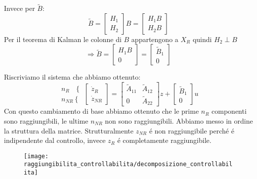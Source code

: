 \documentclass[../main.tex]{subfiles}
\begin{document}
		Invece per $ \tilde B $:
		\[
			\tilde B=
			\begin{bmatrix}
				H_1\\
				H_2
			\end{bmatrix} B =
			\begin{bmatrix}
				H_1 B\\
				H_2 B
			\end{bmatrix}
		\]
		Per il teorema di Kalman le colonne di $ B $ appartengono a $ X_R $ quindi $ H_2 \perp B $
		\[
			\Rightarrow \tilde B =
			\begin{bmatrix}
				H_1 B\\
				0
			\end{bmatrix} =
			\begin{bmatrix}
					\tilde B_1\\
					0
			\end{bmatrix}
		\]
		
		Riscriviamo il sistema che abbiamo ottenuto:
		\[
			\begin{matrix}
				n_R \phantom{R} \left\lbrace \right.\\
				n_{NR} \left\lbrace \right.
			\end{matrix}
			\begin{bmatrix}
				\dot z_R\\
				\dot z_{NR}
			\end{bmatrix} =
			\begin{bmatrix}
				\tilde A_{11} & \tilde A_{12}\\
				0 & \tilde A_{22}
			\end{bmatrix} z +
			\begin{bmatrix}
				\tilde B_1\\
				0
			\end{bmatrix} u
		\]
		Con questo cambiamento di base abbiamo ottenuto che le prime $ n_R $ componenti sono raggiungibili, le ultime $ n_{NR} $ non sono raggiungibili. Abbiamo messo in ordine la struttura della matrice. Strutturalmente $ z_{NR} $ \'e non raggiungibile perch\'e \'e indipendente dal controllo, invece $ z_R $ \'e completamente raggiungibile.
		\begin{figure}[H]
			\centering\texttt{[image: raggiungibilita\_controllabilita/decomposizione\_controllabilita]}
		\end{figure}
		
\end{document}
